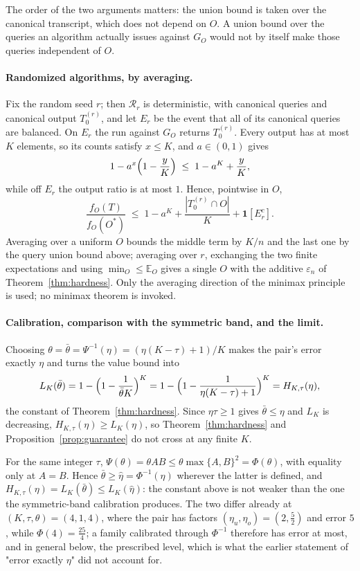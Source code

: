 The order of the two arguments matters: the union bound is taken over the
canonical transcript, which does not depend on $O$.  A union bound over the
queries an algorithm actually issues against $G_O$ would not by itself make
those queries independent of $O$.

\paragraph{Randomized algorithms, by averaging.}
Fix the random seed $r$; then $\mathcal R_r$ is deterministic, with canonical
queries and canonical output $T_0^{(r)}$, and let $E_r$ be the event that all
of its canonical queries are balanced.  On $E_r$ the run against $G_O$ returns
$T_0^{(r)}$.  Every output has at most $K$ elements, so its counts satisfy
$x\le K$, and $a\in(0,1)$ gives
\[
  1-a^{x}\Bigl(1-\frac yK\Bigr)\;\le\;1-a^{K}+\frac yK ,
\]
while off $E_r$ the output ratio is at most $1$.  Hence, pointwise in $O$,
\[
  \frac{f_O(T)}{f_O(O^{\ast})}
  \;\le\;1-a^{K}+\frac{|T_0^{(r)}\cap O|}{K}+\mathbf 1[E_r^{c}] .
\]
Averaging over a uniform $O$ bounds the middle term by $K/n$ and the last one
by the query union bound above; averaging over $r$, exchanging the two finite
expectations and using $\min_O\le\mathbb E_O$ gives a single $O$ with the
additive $\varepsilon_n$ of Theorem~\ref{thm:hardness}.  Only the averaging
direction of the minimax principle is used; no minimax theorem is invoked.

\paragraph{Calibration, comparison with the symmetric band, and the limit.}
Choosing $\theta=\bar\theta=\Psi^{-1}(\eta)=(\eta(K-\tau)+1)/K$ makes the
pair's error exactly $\eta$ and turns the value bound into
\[
  L_K(\bar\theta)=1-\Bigl(1-\frac1{\bar\theta K}\Bigr)^{K}
  =1-\Bigl(1-\frac1{\eta(K-\tau)+1}\Bigr)^{K}=H_{K,\tau}(\eta),
\]
the constant of Theorem~\ref{thm:hardness}.  Since $\eta\tau\ge1$ gives
$\bar\theta\le\eta$ and $L_K$ is decreasing, $H_{K,\tau}(\eta)\ge L_K(\eta)$,
so Theorem~\ref{thm:hardness} and Proposition~\ref{prop:guarantee} do not
cross at any finite $K$.

For the same integer $\tau$, $\Psi(\theta)=\theta AB\le\theta\max\{A,B\}^{2}
=\Phi(\theta)$, with equality only at $A=B$.  Hence
$\bar\theta\ge\hat\eta=\Phi^{-1}(\eta)$ wherever the latter is defined, and
$H_{K,\tau}(\eta)=L_K(\bar\theta)\le L_K(\hat\eta)$: the constant above is not
weaker than the one the symmetric-band calibration produces.  The two differ
already at $(K,\tau,\theta)=(4,1,4)$, where the pair has factors
$(\eta_u,\eta_o)=(2,\tfrac52)$ and error $5$, while $\Phi(4)=\tfrac{25}4$; a
family calibrated through $\Phi^{-1}$ therefore has error at most, and in
general below, the prescribed level, which is what the earlier statement of
"error exactly $\eta$" did not account for.

